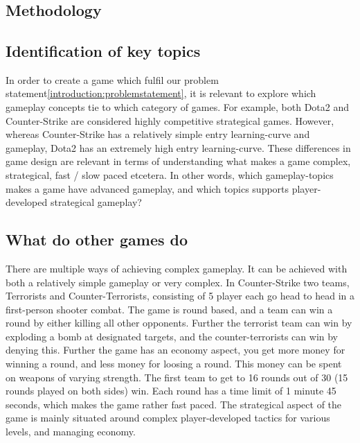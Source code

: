 \section{}
\subsection{Methodology}
\subsection{Identification of key topics}
In order to create a game which fulfil our problem statement\ref{introduction:problemstatement}, it is relevant to explore which gameplay concepts tie to which category of games. For example, both Dota2\cite{dota2} and Counter-Strike\cite{counterstrike} are considered highly competitive strategical games. However, whereas Counter-Strike has a relatively simple entry learning-curve and gameplay, Dota2 has an extremely high entry learning-curve. These differences in game design are relevant in terms of understanding what makes a game complex, strategical, fast / slow paced etcetera.
In other words, which gameplay-topics makes a game have advanced gameplay, and which topics supports player-developed strategical gameplay?

\subsection{What do other games do}
There are multiple ways of achieving complex gameplay. It can be achieved with both a relatively simple gameplay or very complex. In Counter-Strike two teams, Terrorists and Counter-Terrorists, consisting of 5 player each go head to head in a first-person shooter combat. The game is round based, and a team can win a round by either killing all other opponents. Further the terrorist team can win by exploding a bomb at designated targets, and the counter-terrorists can win by denying this. Further the game has an economy aspect, you get more money for winning a round, and less money for loosing a round. This money can be spent on weapons of varying strength. 
The first team to get to 16 rounds out of 30 (15 rounds played on both sides) win. Each round has a time limit of 1 minute 45 seconds, which makes the game rather fast paced. 
The strategical aspect of the game is mainly situated around complex player-developed tactics for various levels, and managing economy. 


